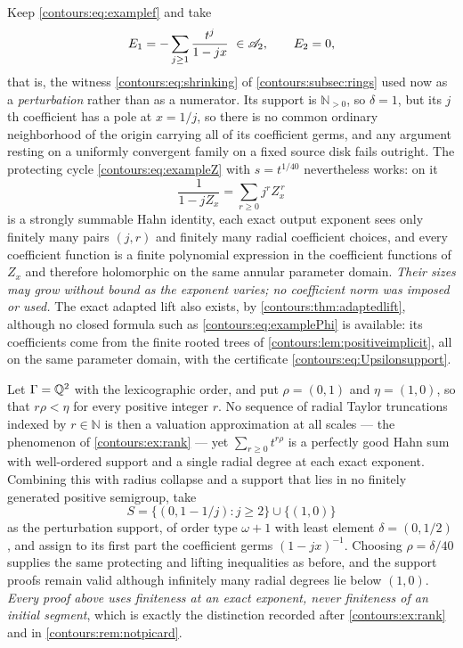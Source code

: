 \documentclass[11pt,letterpaper]{article}
\theoremstyle{definition}
\theoremstyle{remark}
\newcommand{\N}{\mathbb N}\newcommand{\Z}{\mathbb Z}\newcommand{\DD}{\mathbb D}
\numberwithin{equation}{section}
\begin{document}
\begin{example}
\label{contours:ex:radiuscollapse}
Keep \eqref{contours:eq:examplef} and take
\[
  E_1=-\sum_{j\ge1}\frac{t^j}{1-jx}\ \in\A_2,\qquad E_2=0,
\]
that is, the witness \eqref{contours:eq:shrinking} of
\cref{contours:subsec:rings} used now as a \emph{perturbation} rather than as a
numerator. Its support is $\N_{>0}$, so $\delta=1$, but its $j$th coefficient has
a pole at $x=1/j$, so there is no common ordinary neighborhood of the origin
carrying all of its coefficient germs, and any argument resting on a uniformly
convergent family on a fixed source disk fails outright. The protecting cycle
\eqref{contours:eq:exampleZ} with $s=t^{1/40}$ nevertheless works: on it
\[
  \frac1{1-jZ_x}=\sum_{r\ge0}j^rZ_x^{\,r}
\]
is a strongly summable Hahn identity, each exact output exponent sees only
finitely many pairs $(j,r)$ and finitely many radial coefficient choices, and
every coefficient function is a finite polynomial expression in the coefficient
functions of $Z_x$ and therefore holomorphic on the same annular parameter
domain. \emph{Their sizes may grow without bound as the exponent varies; no
coefficient norm was imposed or used.} The exact adapted lift also exists, by
\cref{contours:thm:adaptedlift}, although no closed formula such as
\eqref{contours:eq:examplePhi} is available: its coefficients come from the
finite rooted trees of \cref{contours:lem:positiveimplicit}, all on the same
parameter domain, with the certificate \eqref{contours:eq:Upsilonsupport}.
\end{example}

\begin{example}
\label{contours:ex:nonarchsupport}
Let $\Gamma=\mathbb Q^2$ with the lexicographic order, and put $\rho=(0,1)$ and
$\eta=(1,0)$, so that $r\rho<\eta$ for every positive integer $r$. No sequence of
radial Taylor truncations indexed by $r\in\N$ is then a valuation approximation
at all scales --- the phenomenon of \cref{contours:ex:rank} --- yet
$\sum_{r\ge0}t^{r\rho}$ is a perfectly good Hahn sum with well-ordered support
and a single radial degree at each exact exponent. Combining this with radius
collapse and a support that lies in no finitely generated positive semigroup,
take
\[
  S=\bigl\{(0,1-1/j):j\ge2\bigr\}\cup\bigl\{(1,0)\bigr\}
\]
as the perturbation support, of order type $\omega+1$ with least element
$\delta=(0,1/2)$, and assign to its first part the coefficient germs
$(1-jx)^{-1}$. Choosing $\rho=\delta/40$ supplies the same protecting and lifting
inequalities as before, and the support proofs remain valid although infinitely
many radial degrees lie below $(1,0)$. \emph{Every proof above uses finiteness at
an exact exponent, never finiteness of an initial segment}, which is exactly the
distinction recorded after \cref{contours:ex:rank} and in
\cref{contours:rem:notpicard}.
\end{example}
\end{document}
